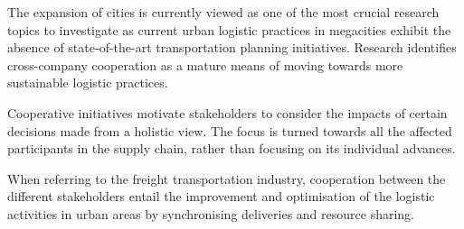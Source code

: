 The expansion of cities is currently viewed as one of the most crucial research topics to investigate \citep{figiel2014development} as current urban logistic practices in megacities exhibit the absence of state-of-the-art transportation planning initiatives. Research identifies cross-company cooperation as a mature means of moving towards more sustainable logistic practices.  


Cooperative initiatives motivate stakeholders to consider the impacts of certain decisions made from a holistic view. The focus is turned towards all the affected participants in the supply chain, rather than focusing on its individual advances. \par




When referring to the freight transportation industry, cooperation between the different stakeholders entail the improvement and optimisation of the logistic activities in urban areas by synchronising deliveries and resource sharing.\par

